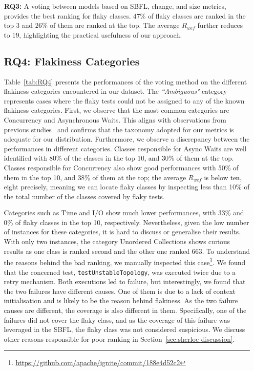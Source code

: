 \begin{tcolorbox}[
    left=2pt,right=2pt,top=2pt,bottom=2pt,
    arc=0pt,
    boxrule=1.2pt
]
\textbf{RQ3:} 
A voting between models based on SBFL, change, and size metrics, provides the best ranking for flaky classes.
47\% of flaky classes are ranked in the top 3 and 26\% of them are ranked at the top. The average $R_{wef}$ further reduces to 19, highlighting the practical usefulness of our approach.  
\end{tcolorbox}

\subsection{RQ4: Flakiness Categories}
Table~\ref{tab:RQ4} presents the performances of the voting method on the different flakiness categories encountered in our dataset.
The \textit{``Ambiguous"} category represents cases where the flaky tests could not be assigned to any of the known flakiness categories.
First, we observe that the most common categories are Concurrency and Asynchronous Waits.
This aligns with observations from previous studies~\cite{Luo2014,Lam2020a,Eck2019} and confirms that the taxonomy adopted for our metrics is adequate for our distribution.
Furthermore, we observe a discrepancy between the performances in different categories.
Classes responsible for Async Waits are well identified with 80\% of the classes in the top 10, and 30\% of them at the top.
Classes responsible for Concurrency also show good performances with 50\% of them in the top 10, and 38\% of them at the top; the average $R_{wef}$ is below ten, eight precisely, meaning we can locate flaky classes by inspecting less than 10\% of the total number of the classes covered by flaky tests. 

Categories such as Time and I/O show much lower performances, with 33\% and 0\% of flaky classes in the top 10, respectively.
Nevertheless, given the low number of instances for these categories, it is hard to discuss or generalise their results.
With only two instances, the category Unordered Collections shows curious results as one class is ranked second and the other one ranked 663. 
To understand the reasons behind the bad ranking, we manually inspected this case\footnote{\url{https://github.com/apache/ignite/commit/188e4d52c2}}.  
We found that the concerned test, \texttt{testUnstableTopology}, was executed twice due to a retry mechanism. Both executions led to failure, but interestingly, we found that the two failures have different causes. One of them is due to a lack of context initialisation and is likely to be the reason behind flakiness. 
As the two failure causes are different, the coverage is also different in them.
Specifically, one of the failures  did not cover the flaky class, and as the coverage of this failure was leveraged in the SBFL, the flaky class was not considered suspicious.
We discuss other reasons responsible for poor ranking in Section~\ref{sec:sherloc-discussion}.

